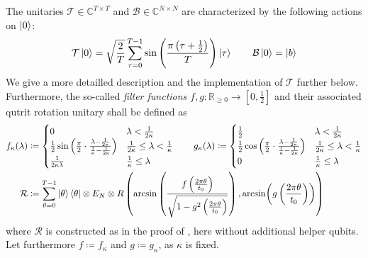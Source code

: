 \phantom{}

The unitaries \(\mathcal{T} \in \mathbb{C}^{T \times T}\) and \(\mathcal{B} \in \mathbb{C}^{N \times N}\) are characterized by the following actions on \(\ket{0}\):
\begin{align}
    \mathcal{T}\ket{0} = \sqrt{\frac{2}{T}}\sum_{\tau = 0}^{T-1}\sin\left(\frac{\pi\left(\tau+\frac{1}{2}\right)}{T}\right)\ket{\tau} \qquad \mathcal{B}\ket{0} = \ket{b} \label{hhl_helper_init_proc_conditions}
\end{align}
We give a more detailled description and the implementation of \(\mathcal{T}\) further below. Furthermore, the so-called \emph{filter functions} \(f, g\colon \mathbb{R}_{\geq 0} \to \left[0, \frac{1}{2}\right]\) and their associated qutrit rotation unitary shall be defined as
\begin{align}
    f_{\kappa}(\lambda) &\coloneqq \begin{cases}
        0 & \lambda < \frac{1}{2\kappa}\\
        \frac{1}{2}\sin\left(\frac{\pi}{2} \cdot \frac{\lambda-\frac{1}{2\kappa}}{\frac{1}{\kappa}-\frac{1}{2\kappa}}\right) & \frac{1}{2\kappa} \leq \lambda < \frac{1}{\kappa}\\
        \frac{1}{2\kappa\lambda} & \frac{1}{\kappa} \leq \lambda
    \end{cases} \qquad g_{\kappa}(\lambda) \coloneqq \begin{cases}
        \frac{1}{2} & \lambda < \frac{1}{2\kappa}\\
        \frac{1}{2}\cos\left(\frac{\pi}{2} \cdot \frac{\lambda-\frac{1}{2\kappa}}{\frac{1}{\kappa}-\frac{1}{2\kappa}}\right) & \frac{1}{2\kappa} \leq \lambda < \frac{1}{\kappa}\\
        0 & \frac{1}{\kappa} \leq \lambda
    \end{cases} \label{filter_functions}\\
    \mathcal{R} &\coloneqq \sum_{\theta = 0}^{T-1} \ket{\theta}\bra{\theta} \otimes E_N \otimes R\left(\arcsin\left(\frac{f\left(\frac{2 \pi \theta}{t_0}\right)}{\sqrt{1-g^2\left(\frac{2 \pi \theta}{t_0}\right)}}\right), \arcsin(g\left(\frac{2 \pi \theta}{t_0}\right))\right)
\end{align}
where \(\mathcal{R}\) is constructed as in the proof of , here without additional helper qubits. Let furthermore \(f \coloneqq f_\kappa\) and \(g \coloneqq g_\kappa\), as \(\kappa\) is fixed.

